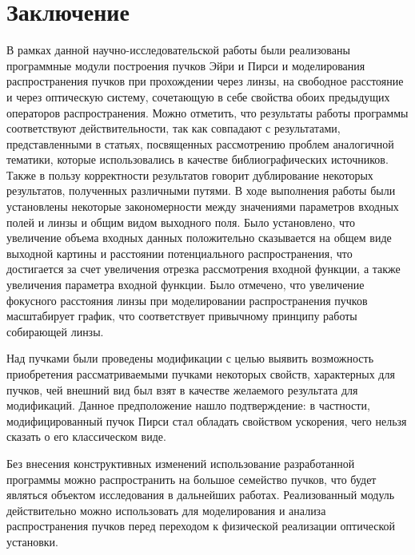 \section*{Заключение}
{
	В рамках данной научно-исследовательской работы были реализованы
программные модули построения пучков Эйри и Пирси и моделирования
распространения пучков при прохождении через линзы, на свободное расстояние и через оптическую систему, сочетающую в себе свойства обоих предыдущих операторов распространения. Можно отметить, что
результаты работы программы соответствуют действительности, так как
совпадают с результатами, представленными в статьях, посвященных
рассмотрению проблем аналогичной тематики, которые использовались в
качестве библиографических источников. Также в пользу корректности результатов говорит дублирование некоторых результатов, полученных различными путями. В ходе выполнения работы были
установлены некоторые закономерности между значениями параметров
входных полей и линзы и общим видом выходного поля. Было установлено, что
увеличение объема входных данных положительно сказывается на общем виде
выходной картины и расстоянии потенциального распространения, что достигается за счет увеличения отрезка рассмотрения
входной функции, а также увеличения параметра входной функции. Было
отмечено, что увеличение фокусного расстояния линзы при моделировании
распространения пучков масштабирует график, что соответствует привычному принципу работы собирающей линзы.

	Над пучками были проведены модификации с целью выявить возможность приобретения рассматриваемыми пучками некоторых свойств, характерных для пучков, чей внешний вид был взят в качестве желаемого результата для модификаций. Данное предположение нашло подтверждение: в частности, модифицированный пучок Пирси стал обладать свойством ускорения, чего нельзя сказать о его классическом виде.

	Без внесения конструктивных изменений использование разработанной
программы можно распространить на большое семейство пучков, что будет
являться объектом исследования в дальнейших работах. Реализованный модуль
действительно можно использовать для моделирования и анализа
распространения пучков перед переходом к физической реализации оптической
установки.

\newpage
}




